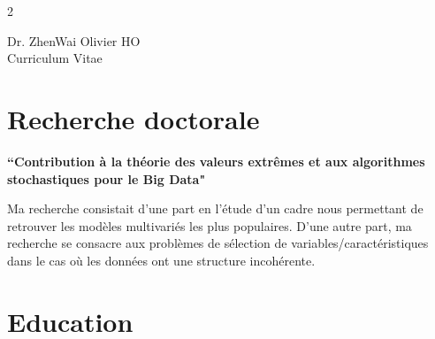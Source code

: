 \documentclass[10pt]{article} %
\begin{document}
\begin{paracol}{2} %


\parbox[top][0.12\textheight][c]{\linewidth}{ %
	\vspace{-0.04\textheight} %
	\centering %
	{\sffamily\Huge Dr. ZhenWai Olivier HO}\\\medskip %
	{\Huge\color{headings}\cvtextfont Curriculum Vitae}
}


\section{Recherche doctorale}

{\raggedright\textbf{``Contribution à la théorie des valeurs extrêmes et aux algorithmes stochastiques pour le Big Data"}\\\medskip}

Ma recherche consistait d'une part en l'étude d'un cadre nous permettant de retrouver les modèles multivariés les plus populaires. D'une autre part, ma recherche se consacre aux problèmes de sélection de variables/caractéristiques dans le cas où les données ont une structure incohérente.


\medskip %



\section{Education} 



\end{paracol}
\end{document}
